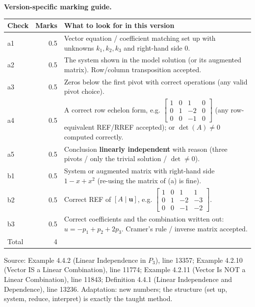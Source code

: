 \documentclass[11pt,a4paper]{article}
\newcommand{\Src}[1]{{\footnotesize\color{black!65}Source: #1}}
\begin{document}
\textbf{Version-specific marking guide.}\par
\begin{tabularx}{\linewidth}{@{}l r >{\raggedright\arraybackslash}X@{}}\toprule Check & Marks & What to look for in this version\\\midrule
a1 & 0.5 & Vector equation / coefficient matching set up with unknowns $k_1,k_2,k_3$ and right-hand side $0$.\\
a2 & 0.5 & The system shown in the model solution (or its augmented matrix). Row/column transposition accepted.\\
a3 & 0.5 & Zeros below the first pivot with correct operations (any valid pivot choice).\\
a4 & 0.5 & A correct row echelon form, e.g. $\left[\begin{array}{ccc|c} 1 & 0 & 1 & 0 \\ 0 & 1 & -2 & 0 \\ 0 & 0 & -1 & 0 \end{array}\right]$ (any row-equivalent REF/RREF accepted); or $\det(A)\neq0$ computed correctly.\\
a5 & 0.5 & Conclusion \textbf{linearly independent} with reason (three pivots / only the trivial solution / $\det\neq0$).\\
b1 & 0.5 & System or augmented matrix with right-hand side $1-x+x^{2}$ (re-using the matrix of (a) is fine).\\
b2 & 0.5 & Correct REF of $[A\mid\mathbf{u}]$, e.g. $\left[\begin{array}{ccc|c} 1 & 0 & 1 & 1 \\ 0 & 1 & -2 & -3 \\ 0 & 0 & -1 & -2 \end{array}\right]$.\\
b3 & 0.5 & Correct coefficients and the combination written out: $u=-p_1+p_2+2p_3$. Cramer's rule / inverse matrix accepted.\\
\midrule Total & 4 & \\\bottomrule\end{tabularx}
\Src{Example 4.4.2 (Linear Independence in $P_3$), line 13357; Example 4.2.10 (Vector IS a Linear Combination), line 11774; Example 4.2.11 (Vector Is NOT a Linear Combination), line 11843; Definition 4.4.1 (Linear Independence and Dependence), line 13236. Adaptation: new numbers; the structure (set up, system, reduce, interpret) is exactly the taught method.}\par
\end{document}
